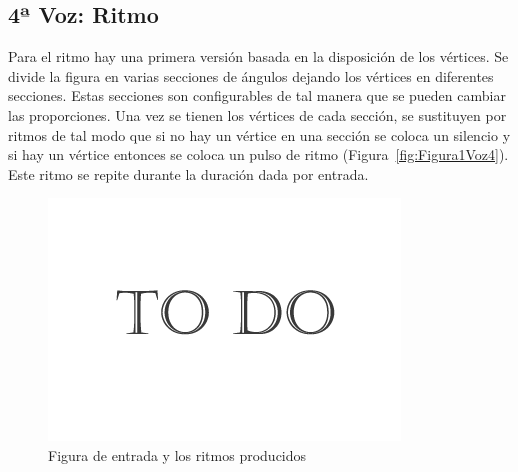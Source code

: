
\subsection{4ª Voz: Ritmo}

Para el ritmo hay una primera versión basada en la disposición de los vértices. Se divide la figura en varias secciones de ángulos dejando los vértices en diferentes secciones. Estas secciones son configurables de tal manera que se pueden cambiar las proporciones. Una vez se tienen los vértices de cada sección, se sustituyen por ritmos de tal modo que si no hay un vértice en una sección se coloca un silencio y si hay un vértice entonces se coloca un pulso de ritmo (Figura~\ref{fig:Figura1Voz4}). Este ritmo se repite durante la duración dada por entrada.

		\begin{figure}[htbp]
		\centering
		\hspace*{0.0in}
		\includegraphics[scale=0.57]{graphics/todo.png}
		\caption{Figura de entrada y los ritmos producidos}
		\label{fig:Figur1Voz4}
		\end{figure}

